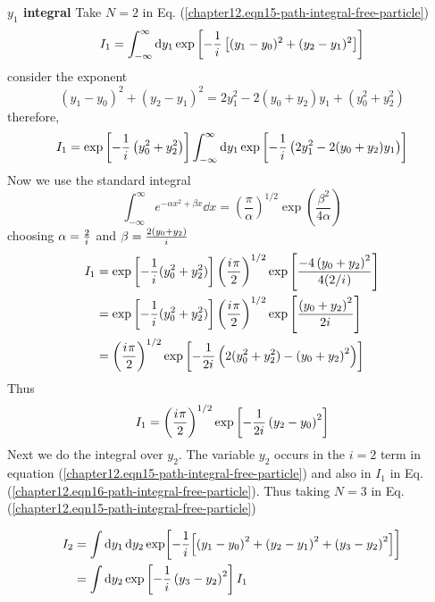 	\textbf{$y_1$ integral}
	Take $N=2$ in Eq. (\ref{chapter12.eqn15-path-integral-free-particle})
	\begin{equation}
		I_1 = \int_{-\infty}^{\infty} \dd{y_1} \exp\left[-\frac{1}{{i\mkern1mu}} \left[(y_1 - y_0)^2 + (y_2 - y_1)^2\right]\right]
	\end{equation}
	consider the exponent
	\begin{equation}
		(y_1 - y_0)^2 + (y_2 - y_1)^2 = 2 y_1^2 - 2 (y_0 + y_2) y_1 + (y_0^2+y_2^2)
	\end{equation}
	therefore,
	\begin{equation}
		I_1 = \exp \left[-\frac{1}{{i\mkern1mu}} \left(y_0^2+ y_2^2\right)\right] \int_{-\infty}^{\infty} \dd{y_1} \exp\left[-\frac{1}{{i\mkern1mu}} \left(2y_1^2 - 2(y_0 + y_2) y_1\right)
		\right]
	\end{equation}
	Now we use the standard integral
	\begin{equation}
		\int_{-\infty}^{\infty} e^{-\alpha x^2 + \beta x} \dd{x} = \left(\frac{\pi}{\alpha}\right)^{1/2} \exp \left(\frac{\beta^2}{4\alpha}\right)
	\end{equation}
	choosing $\alpha = \frac{2}{{i\mkern1mu}}$ and $\beta = \frac{2(y_0 + y_2)}{{i\mkern1mu}}$
	\begin{align*}
		I_1 
		&= \exp \left[-\frac{1}{{i\mkern1mu}} (y_0^2 + y_2^2)\right] \left(\frac{{i\mkern1mu} \pi}{2}\right)^{1/2} \exp\left[\frac{-4 \left(y_0 +y_2\right)^2}{4 (2/{i\mkern1mu})}\right]\\
		&= \exp \left[-\frac{1}{{i\mkern1mu}} (y_0^2 + y_2^2)\right] \left(\frac{{i\mkern1mu} \pi}{2}\right)^{1/2} \exp\left[\frac{\left(y_0 +y_2\right)^2}{2{i\mkern1mu}}\right] \\
		&= \left(\frac{{i\mkern1mu} \pi}{2}\right)^{1/2} \exp \left[-\frac{1}{2{i\mkern1mu}} \left( 2(y_0^2 + y_2^2) - \left(y_0 +y_2\right)^2 \right)\right]
	\end{align*}
	Thus
	\begin{equation}
		I_1 = \left(\frac{{i\mkern1mu} \pi}{2}\right)^{1/2} \exp \left[-\frac{1}{2{i\mkern1mu}} \left(y_2 - y_0\right)^2\right]
		\label{chapter12.eqn16-path-integral-free-particle}
	\end{equation}
	Next we do the integral over $y_2$. The variable $y_2$ occurs in the $i=2$ term in equation (\ref{chapter12.eqn15-path-integral-free-particle}) and also in $I_1$ in Eq. (\ref{chapter12.eqn16-path-integral-free-particle}). Thus taking $N=3$ in Eq. (\ref{chapter12.eqn15-path-integral-free-particle})
	
	\begin{align*}
	I_2 &= \int \dd{y_1} \dd{y_2} \exp[-\frac{1}{{i\mkern1mu}}\qty[\qty(y_1 - y_0)^2 + \qty(y_2 - y_1)^2 + \qty(y_3 - y_2)^2]] \\
	&=\int \dd{y_2} \exp \left[-\frac{1}{{i\mkern1mu}} \left(y_3 - y_2\right)^2\right] I_1
	\end{align*}
	

